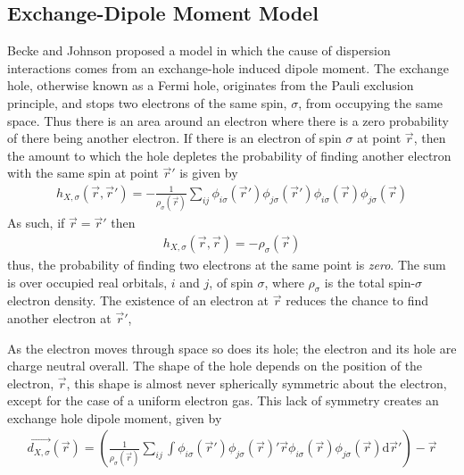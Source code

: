 \documentclass[10pt,a4paper,twocolumn,twoside]{extarticle}
\renewcommand{\d}{\text{d}}
\begin{document}
	\subsection{Exchange-Dipole Moment Model}
	\label{sec:XDM}
	Becke and Johnson proposed a model\cite{XDM-Original} in which the cause of dispersion interactions comes from an exchange-hole induced dipole moment.\cite{XDM-dipole,XDM-HF,XDM-HigherOrder} The exchange hole, otherwise known as a Fermi hole, originates from the Pauli exclusion principle, and stops two electrons of the same spin, $\sigma$, from occupying the same space. Thus there is an area around an electron where there is a zero probability of there being another electron. If there is an electron of spin $\sigma$ at point $\vec{r}$, then the amount to which the hole depletes the probability of finding another electron with the same spin at point $\vec{r}'$ is given by 
	\begin{align}
		h_{X,\sigma}(\vec{r},\vec{r}') = -\frac{1}{\rho_\sigma(\vec{r})} \sum_{ij} 
										\phi_{i\sigma}(\vec{r}') \phi_{j\sigma}(\vec{r}')
										\phi_{i\sigma}(\vec{r}) \phi_{j\sigma}(\vec{r}) 
	\end{align}
	As such, if $\vec{r} = \vec{r}'$ then 
	\begin{align}
		h_{X,\sigma}(\vec{r}, \vec{r}) = -\rho_\sigma(\vec{r})
	\end{align}
	thus, the probability of finding two electrons at the same point is \emph{zero}.
	The sum is over occupied real orbitals, $i$ and $j$, of spin $\sigma$, where $\rho_\sigma$ is the total spin-$\sigma$ electron density. The existence of an electron at $\vec{r}$ reduces the chance to find another electron at $\vec{r}'$, 

	As the electron moves through space so does its hole; the electron and its hole are charge neutral overall. 
	The shape of the hole depends on the position of the electron, $\vec{r}$, this shape is almost never spherically symmetric about the electron, except for the case of a uniform electron gas. This lack of symmetry creates an exchange hole dipole moment, given by 
	\footnotesize
	\begin{align}
		\label{eq:exchange-dipole}
		\vec{d_{X,\sigma}}(\vec{r}) = \left( \frac{1}{\rho_\sigma(\vec{r})} \sum_{ij}\int
									 \phi_{i\sigma}(\vec{r}') \phi_{j\sigma}(\vec{r})' 
									 \vec{r}\phi_{i\sigma}(\vec{r}) \phi_{j\sigma}(\vec{r}) 
									 \d\vec{r}'\right) - \vec{r}
	\end{align}
	\normalsize
\end{document}
